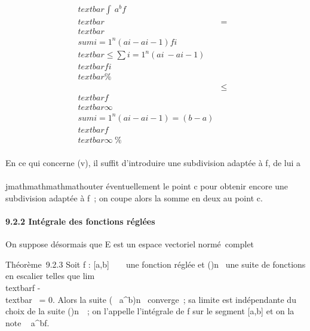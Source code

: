 \begin{align*}
\\textbar{}\int ~
a^bf\\textbar{}& =&
\\textbar{}\\sum
i=1^n(a i -
ai-1)fi\\textbar{}
\leq\sum i=1^n(a i~ -
ai-1)\\textbar{}fi\\textbar{}\%&
\\ & \leq&
\\textbar{}f\\textbar{}\infty~\\sum
i=1^n(a i - ai-1) = (b -
a)\\textbar{}f\\textbar{}\infty~ \%&
\\ \end{align*}

En ce qui concerne (v), il suffit d'introduire une subdivision \sigma adaptée
à f, de lui a\\\\jmathmathmathmathouter éventuellement le point c pour obtenir encore une
subdivision adaptée à f~; on coupe alors la somme en deux au point c.

\paragraph{9.2.2 Intégrale des fonctions réglées}

On suppose désormais que E est un espace vectoriel normé~complet

Théorème~9.2.3 Soit f : {[}a,b{]} \rightarrow~ ~ une fonction réglée et
(\phin)n\in{}~ une suite de fonctions en escalier telles
que lim~\\textbar{}f -
\phin\\textbar{}\infty~ = 0. Alors la suite
\left (\int ~
a^b\phin\right )n\in{}~
converge~; sa limite est indépendante du choix de la suite
(\phin)n\in{}~~; on l'appelle l'intégrale de f sur le
segment {[}a,b{]} et on la note \int ~
a^bf.

